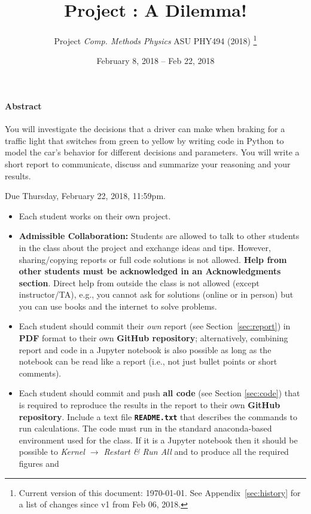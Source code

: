 \documentclass[letterpaper]{scrartcl}
\title{{\Large Project \anumber: A Dilemma!}}
\author{{\sffamily\large Project \emph{Comp. Methods Physics} ASU
    PHY494 (2018)}%
  \thanks{Current version of this document: \today. See
    Appendix~\protect\ref{sec:history} for a list of changes since v1
    from Feb 06, 2018.}}
\date{{\sffamily\large February 8, 2018 -- Feb 22, 2018}}
\begin{document}
\maketitle

\paragraph{Abstract}

You will investigate the decisions that a driver can make when braking
for a traffic light that switches from green to yellow by writing code
in Python to model the car's behavior for different decisions and
parameters. You will write a short report to communicate, discuss and
summarize your reasoning and your results.

\begin{framed}
  \noindent
  Due Thursday, February 22, 2018, 11:59pm.
  \begin{itemize}
  \item Each student works on their own project.
  \item \textbf{Admissible Collaboration:} Students are allowed to
    talk to other students in the class about the project and exchange
    ideas and tips. However, sharing/copying reports or full code
    solutions is not allowed. \textbf{Help from other students must be
      acknowledged in an Acknowledgments section}.  Direct help from
    outside the class is not allowed (except instructor/TA), e.g.,
    you cannot ask for solutions (online or in person) but you can use
    books and the internet to solve problems.
  \item Each student should commit their \emph{own} report (see
    Section~\ref{sec:report}) in \textbf{PDF} format to their own
    \textbf{GitHub repository}; alternatively, combining report and
    code in a Jupyter notebook is also possible as long as the
    notebook can be read like a report (i.e., not just bullet points
    or short comments).
  \item Each student should commit and push \textbf{all code} (see
    Section \ref{sec:code}) that is required to reproduce the results
    in the report to their own \textbf{GitHub repository}. Include a
    text file \textbf{\texttt{README.txt}} that describes the commands
    to run calculations. The code must run in the standard
    anaconda-based environment used for the class. If it is a Jupyter
    notebook then it should be possible to \emph{Kernel $\rightarrow$
      Restart \& Run All} and to produce all the required figures and

\end{itemize}
\end{framed}
\end{document}
